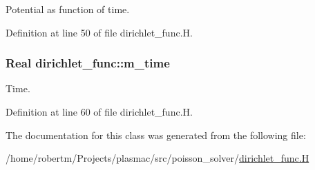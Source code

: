 Potential as function of time. 



Definition at line 50 of file dirichlet\+\_\+func.\+H.

\subsubsection[{\texorpdfstring{m\+\_\+time}{m_time}}]{\setlength{\rightskip}{0pt plus 5cm}Real dirichlet\+\_\+func\+::m\+\_\+time\hspace{0.3cm}{\ttfamily [protected]}}\hypertarget{classdirichlet__func_a955c8356798afbbb218ac6a11f6b1444}{}\label{classdirichlet__func_a955c8356798afbbb218ac6a11f6b1444}


Time. 



Definition at line 60 of file dirichlet\+\_\+func.\+H.



The documentation for this class was generated from the following file\+:\begin{DoxyCompactItemize}
\item 
/home/robertm/\+Projects/plasmac/src/poisson\+\_\+solver/\hyperlink{dirichlet__func_8H}{dirichlet\+\_\+func.\+H}\end{DoxyCompactItemize}
